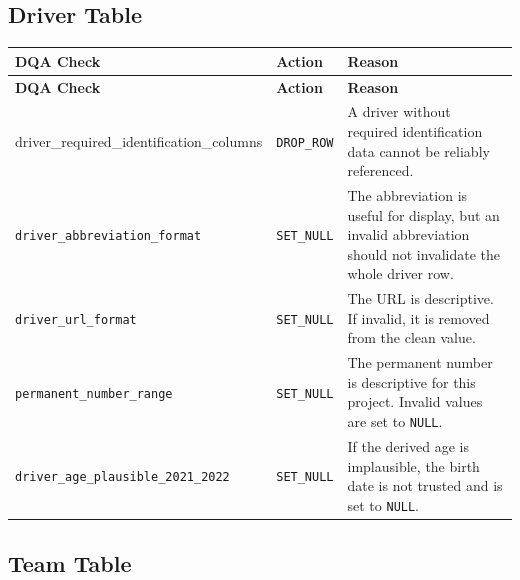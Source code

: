 \documentclass[a4paper,11pt]{article}
\begin{document}
	\subsection{Driver Table}
	
	\begin{longtable}{p{6cm}p{2.5cm}p{6.4cm}}
		\toprule
		\textbf{DQA Check} & \textbf{Action} & \textbf{Reason} \\
		\midrule
		\endfirsthead
		
		\toprule
		\textbf{DQA Check} & \textbf{Action} & \textbf{Reason} \\
		\midrule
		\endhead
		
		{\small driver\_required\_identification\_columns}
		& \texttt{DROP\_ROW}
		& A driver without required identification data cannot be reliably referenced. \\
		\midrule
		
		\texttt{driver\_abbreviation\_format}
		& \texttt{SET\_NULL}
		& The abbreviation is useful for display, but an invalid abbreviation should not invalidate the whole driver row. \\
		\midrule
		
		\texttt{driver\_url\_format}
		& \texttt{SET\_NULL}
		& The URL is descriptive. If invalid, it is removed from the clean value. \\
		\midrule
		
		\texttt{permanent\_number\_range}
		& \texttt{SET\_NULL}
		& The permanent number is descriptive for this project. Invalid values are set to \texttt{NULL}. \\
		\midrule
		
		\texttt{driver\_age\_plausible\_2021\_2022}
		& \texttt{SET\_NULL}
		& If the derived age is implausible, the birth date is not trusted and is set to \texttt{NULL}. \\
		\bottomrule
	\end{longtable}
	
	\subsection{Team Table}
	
\end{document}
